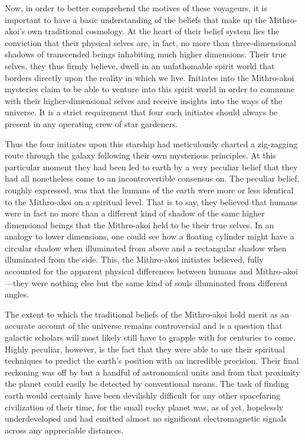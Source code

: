 \documentclass[12pt]{article}
\begin{document}
Now,
in order to better comprehend the motives of these voyageurs,
it is important to have a basic understanding of the beliefs that make up the Mithro-akoi's own traditional cosmology.
At the heart of their belief system lies the conviction that their physical selves are, in fact, no more than three-dimensional shadows of transcended beings inhabiting much higher dimensions.
Their true selves, they thus firmly believe, dwell in an unfathomable spirit world that borders directly upon the reality in which we live.
Initiates into the Mithro-akoi mysteries claim to be able to venture into this spirit world in order to commune with their higher-dimensional selves and receive insights into the ways of the universe.
It is a strict requirement that four such initiates should always be present in any operating crew of star gardeners.

Thus the four initiates upon this starship had meticulously charted a zig-zagging route through the galaxy following their own mysterious principles.
At this particular moment they had been led to earth by a very peculiar belief that they had all nonetheless come to an incontrovertible consensus on.
The peculiar belief, roughly expressed, was that the humans of the earth were more or less identical to the Mithro-akoi on a spiritual level.
That is to say, they believed that humans were in fact no more than a different kind of shadow of the same higher dimensional beings that the Mithro-akoi held to be their true selves.
In an analogy to lower dimensions, one could see how a floating cylinder might have a circular shadow when illuminated from above and a rectangular shadow when illuminated from the side.
This, the Mithro-akoi initiates believed, fully accounted for the apparent physical differences between humans and Mithro-akoi---they were nothing else but the same kind of souls illuminated from different angles.

The extent to which the traditional beliefs of the Mithro-akoi hold merit as an accurate account of the universe remains controversial and is a question that galactic scholars will most likely still have to grapple with for centuries to come.
Highly peculiar, however, is the fact that they were able to use their spiritual techniques to predict the earth's position with an incredible precision.
Their final reckoning was off by but a handful of astronomical units and from that proximity the planet could easily be detected by conventional means.
The task of finding earth would certainly have been devilishly difficult for any other spacefaring civilization of their time, 
for the small rocky planet was, as of yet, hopelessly underdeveloped and had emitted almost no significant electromagnetic signals across any appreciable distances.
\end{document}
